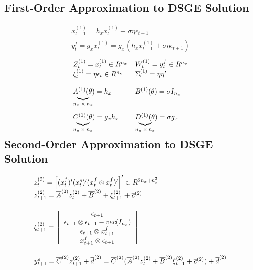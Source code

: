\documentclass[10pt]{article}
\numberwithin{equation}{section}
\theoremstyle{definition}
\theoremstyle{remark}
\newcommand\undermat[2]{%
  \makebox[0pt][l]{$\smash{\underbrace{\phantom{%
    \begin{matrix}#2\end{matrix}}}_{\text{$#1$}}}$}#2}
\begin{document}
\subsection{First-Order Approximation to DSGE Solution}
\begin{eqnarray}\displaystyle  x_{t+1}^{(1)} = h_x x_{t}^{(1)} + \sigma \eta \epsilon_{t+1}\\
y_t^{f} = g_x x_t^{(1)} = g_x (h_x x_{t-1}^{(1)} + \sigma \eta \epsilon_{t+1})\end{eqnarray}
\begin{eqnarray*}
\begin{array}{ll}
Z_t^{(1)} = x_t^{(1)} \in R^{n_x} & W_t^{(1)} = y_t^{f} \in R^{n_y}\\
\xi_t^{(1)} = \eta \epsilon_t \in R^{n_\epsilon} &  \Sigma_{\epsilon}^{(1)} = \eta \eta '\\
\\
\undermat{n_x \times n_x} A^{(1)}(\theta ) = h_x & B^{(1)}(\theta ) = \sigma I_{n_x}\\
\\
\\
\undermat{n_y \times n_x}C^{(1)}(\theta ) = g_xh_x & \undermat{n_y \times n_x}D^{(1)}(\theta ) = \sigma g_x \\

 \end{array}
\end{eqnarray*}


\subsection{Second-Order Approximation to DSGE Solution}
\begin{eqnarray}\displaystyle \begin{array}{l}
	 z_t^{(2)} = \left[ (x_t^f)' (x^s_t)' (x_t^f \otimes x_t^f)' \right] ' \in R^{2n_x + n_x^2}\\
	\vspace{5mm}
z_{t+1}^{(2)} = \overline{A}^{(2)}z_t^{(2)} + \overline{B}^{(2)} + \xi_{t+1}^{(2)} + \overline{c}^{(2)}\\
\vspace{5mm}
 \xi^{(2)}_{t+1} = \left[ \begin{array}{c}
\epsilon_{t+1}\\ \epsilon_{t+1} \otimes \epsilon_{t+1} - vec(I_{n_\epsilon}) \\ \epsilon_{t+1} \otimes x^f_{t+1} \\ x^f_{t+1} \otimes \epsilon_{t+1} \end{array}\right]\\\vspace{5mm}
y_{t+1}^s = \overline{C}^{(2)}z_{t+1}^{(2)} + \overline{d}^{(2)} = \overline{C}^{(2)}(\overline{A}^{(2)}z_t^{(2)} + \overline{B}^{(2)} \xi_{t+1}^{(2)} + \overline{c}^{(2)}) + \overline{d}^{(2)}
\end{array}\end{eqnarray}
\end{document}
